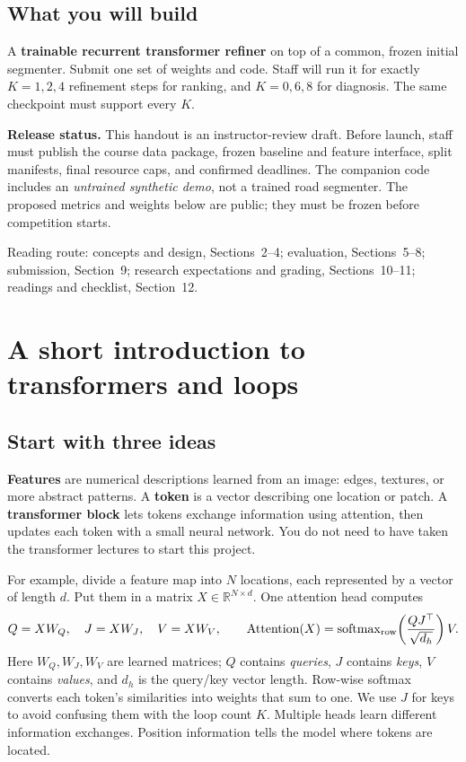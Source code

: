 \documentclass[11pt,letterpaper]{article}
\newcommand{\page}[1]{\clearpage\section{#1}}
\newcommand{\R}{\mathbb{R}}
\newcommand{\smallnote}[1]{{\small\color{graytext}#1\par}}
\begin{document}
\subsection{What you will build}
A \textbf{trainable recurrent transformer refiner} on top of a common, frozen initial segmenter. Submit one set of weights and code. Staff will run it for exactly $K=1,2,4$ refinement steps for ranking, and $K=0,6,8$ for diagnosis. The same checkpoint must support every $K$.

\begin{tcolorbox}[colback=lightgray,colframe=graytext]
\textbf{Release status.} This handout is an instructor-review draft. Before launch, staff must publish the course data package, frozen baseline and feature interface, split manifests, final resource caps, and confirmed deadlines. The companion code includes an \emph{untrained synthetic demo}, not a trained road segmenter. The proposed metrics and weights below are public; they must be frozen before competition starts.
\end{tcolorbox}
\smallnote{Reading route: concepts and design, Sections~2--4; evaluation, Sections~5--8; submission, Section~9; research expectations and grading, Sections~10--11; readings and checklist, Section~12.}

\page{A short introduction to transformers and loops}
\subsection{Start with three ideas}
\textbf{Features} are numerical descriptions learned from an image: edges, textures, or more abstract patterns. A \textbf{token} is a vector describing one location or patch. A \textbf{transformer block} lets tokens exchange information using attention, then updates each token with a small neural network. You do not need to have taken the transformer lectures to start this project.

For example, divide a feature map into $N$ locations, each represented by a vector of length $d$. Put them in a matrix $X\in\R^{N\times d}$. One attention head computes
\begin{equation}
 Q=XW_Q,\quad J=XW_J,\quad V=XW_V,\qquad
 \operatorname{Attention}(X)=\operatorname{softmax}_{\rm row}\!\left(\frac{QJ^\top}{\sqrt{d_h}}\right)V.
\end{equation}
Here $W_Q,W_J,W_V$ are learned matrices; $Q$ contains \emph{queries}, $J$ contains \emph{keys}, $V$ contains \emph{values}, and $d_h$ is the query/key vector length. Row-wise softmax converts each token's similarities into weights that sum to one. We use $J$ for keys to avoid confusing them with the loop count $K$. Multiple heads learn different information exchanges. Position information tells the model where tokens are located.
\end{document}
